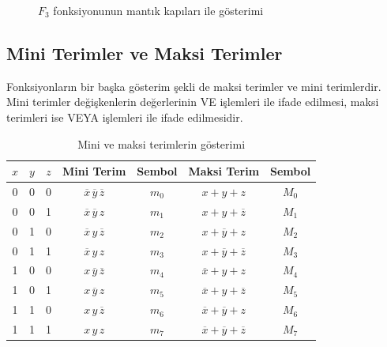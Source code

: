 \begin{figure}[H]
\centering
{}
\caption{$F_3$ fonksiyonunun mantık kapıları ile gösterimi}
\label{fig:B.4}
\end{figure}


\subsection{Mini Terimler ve Maksi Terimler}

Fonksiyonların bir başka gösterim şekli de maksi terimler ve mini terimlerdir. Mini terimler değişkenlerin değerlerinin VE işlemleri ile ifade edilmesi, maksi terimleri ise VEYA işlemleri ile ifade edilmesidir.

\begin{table}[H]
\centering
\caption{Mini ve maksi terimlerin gösterimi}
\label{tab:B.4}
\begin{tabular}{ccc|cc|cc}
\toprule
$x$ & $y$ & $z$ & \textbf{Mini Terim} & \textbf{Sembol} & \textbf{Maksi Terim} & \textbf{Sembol} \\
\midrule
0 & 0 & 0 & $\overline{x}\,\overline{y}\,\overline{z}$ & $m_0$ & $x+y+z$ & $M_0$ \\
0 & 0 & 1 & $\overline{x}\,\overline{y}\,z$ & $m_1$ & $x+y+\overline{z}$ & $M_1$ \\
0 & 1 & 0 & $\overline{x}\,y\,\overline{z}$ & $m_2$ & $x+\overline{y}+z$ & $M_2$ \\
0 & 1 & 1 & $\overline{x}\,y\,z$ & $m_3$ & $x+\overline{y}+\overline{z}$ & $M_3$ \\
1 & 0 & 0 & $x\,\overline{y}\,\overline{z}$ & $m_4$ & $\overline{x}+y+z$ & $M_4$ \\
1 & 0 & 1 & $x\,\overline{y}\,z$ & $m_5$ & $\overline{x}+y+\overline{z}$ & $M_5$ \\
1 & 1 & 0 & $x\,y\,\overline{z}$ & $m_6$ & $\overline{x}+\overline{y}+z$ & $M_6$ \\
1 & 1 & 1 & $x\,y\,z$ & $m_7$ & $\overline{x}+\overline{y}+\overline{z}$ & $M_7$ \\
\bottomrule
\end{tabular}
\end{table}

